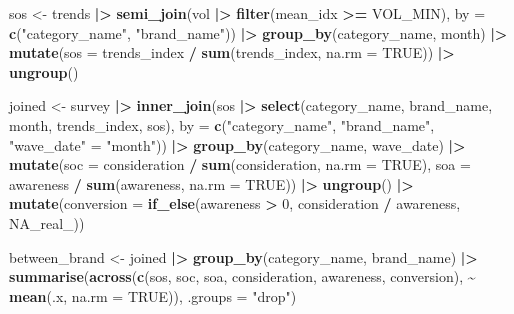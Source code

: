 \documentclass[
]{article}
\newenvironment{Shaded}{\begin{snugshade}}{\end{snugshade}}
\newcommand{\AttributeTok}[1]{\textcolor[rgb]{0.13,0.29,0.53}{#1}}
\newcommand{\ConstantTok}[1]{\textcolor[rgb]{0.56,0.35,0.01}{#1}}
\newcommand{\DecValTok}[1]{\textcolor[rgb]{0.00,0.00,0.81}{#1}}
\newcommand{\FunctionTok}[1]{\textcolor[rgb]{0.13,0.29,0.53}{\textbf{#1}}}
\newcommand{\NormalTok}[1]{#1}
\newcommand{\OtherTok}[1]{\textcolor[rgb]{0.56,0.35,0.01}{#1}}
\newcommand{\SpecialCharTok}[1]{\textcolor[rgb]{0.81,0.36,0.00}{\textbf{#1}}}
\newcommand{\StringTok}[1]{\textcolor[rgb]{0.31,0.60,0.02}{#1}}
\begin{document}
\begin{Shaded}
\begin{Highlighting}[]
\NormalTok{sos }\OtherTok{\textless{}{-}}\NormalTok{ trends }\SpecialCharTok{|\textgreater{}}
  \FunctionTok{semi\_join}\NormalTok{(vol }\SpecialCharTok{|\textgreater{}} \FunctionTok{filter}\NormalTok{(mean\_idx }\SpecialCharTok{\textgreater{}=}\NormalTok{ VOL\_MIN),}
            \AttributeTok{by =} \FunctionTok{c}\NormalTok{(}\StringTok{"category\_name"}\NormalTok{, }\StringTok{"brand\_name"}\NormalTok{)) }\SpecialCharTok{|\textgreater{}}
  \FunctionTok{group\_by}\NormalTok{(category\_name, month) }\SpecialCharTok{|\textgreater{}}
  \FunctionTok{mutate}\NormalTok{(}\AttributeTok{sos =}\NormalTok{ trends\_index }\SpecialCharTok{/} \FunctionTok{sum}\NormalTok{(trends\_index, }\AttributeTok{na.rm =} \ConstantTok{TRUE}\NormalTok{)) }\SpecialCharTok{|\textgreater{}}
  \FunctionTok{ungroup}\NormalTok{()}

\NormalTok{joined }\OtherTok{\textless{}{-}}\NormalTok{ survey }\SpecialCharTok{|\textgreater{}}
  \FunctionTok{inner\_join}\NormalTok{(sos }\SpecialCharTok{|\textgreater{}} \FunctionTok{select}\NormalTok{(category\_name, brand\_name, month, trends\_index, sos),}
             \AttributeTok{by =} \FunctionTok{c}\NormalTok{(}\StringTok{"category\_name"}\NormalTok{, }\StringTok{"brand\_name"}\NormalTok{, }\StringTok{"wave\_date"} \OtherTok{=} \StringTok{"month"}\NormalTok{)) }\SpecialCharTok{|\textgreater{}}
  \FunctionTok{group\_by}\NormalTok{(category\_name, wave\_date) }\SpecialCharTok{|\textgreater{}}
  \FunctionTok{mutate}\NormalTok{(}\AttributeTok{soc =}\NormalTok{ consideration }\SpecialCharTok{/} \FunctionTok{sum}\NormalTok{(consideration, }\AttributeTok{na.rm =} \ConstantTok{TRUE}\NormalTok{),}
         \AttributeTok{soa =}\NormalTok{ awareness }\SpecialCharTok{/} \FunctionTok{sum}\NormalTok{(awareness, }\AttributeTok{na.rm =} \ConstantTok{TRUE}\NormalTok{)) }\SpecialCharTok{|\textgreater{}}
  \FunctionTok{ungroup}\NormalTok{() }\SpecialCharTok{|\textgreater{}}
  \FunctionTok{mutate}\NormalTok{(}\AttributeTok{conversion =} \FunctionTok{if\_else}\NormalTok{(awareness }\SpecialCharTok{\textgreater{}} \DecValTok{0}\NormalTok{, consideration }\SpecialCharTok{/}\NormalTok{ awareness, }\ConstantTok{NA\_real\_}\NormalTok{))}

\NormalTok{between\_brand }\OtherTok{\textless{}{-}}\NormalTok{ joined }\SpecialCharTok{|\textgreater{}}
  \FunctionTok{group\_by}\NormalTok{(category\_name, brand\_name) }\SpecialCharTok{|\textgreater{}}
  \FunctionTok{summarise}\NormalTok{(}\FunctionTok{across}\NormalTok{(}\FunctionTok{c}\NormalTok{(sos, soc, soa, consideration, awareness, conversion),}
                   \SpecialCharTok{\textasciitilde{}} \FunctionTok{mean}\NormalTok{(.x, }\AttributeTok{na.rm =} \ConstantTok{TRUE}\NormalTok{)), }\AttributeTok{.groups =} \StringTok{"drop"}\NormalTok{)}


\end{Highlighting}
\end{Shaded}
\end{document}

